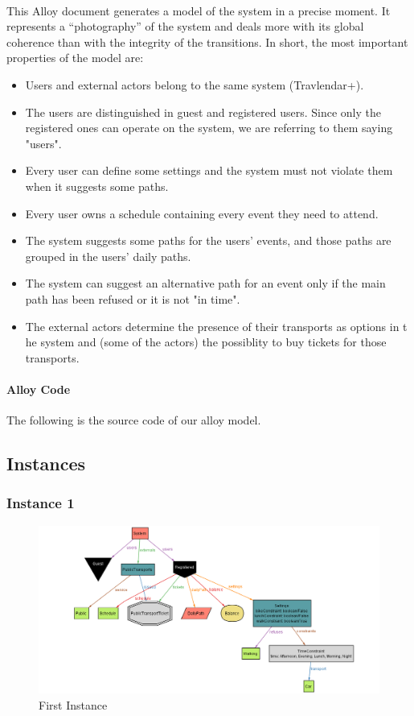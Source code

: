\documentclass{article}
\begin{document}
\paragraph{}
This Alloy document generates a model of the system in a precise moment. It represents a “photography” of the system and deals more with its global coherence than with the integrity of the transitions. In short, the most important properties of the model are:
\begin{itemize}
\item{} Users and external actors belong to the same system (Travlendar+).
\item{} The users are distinguished in guest and registered users. Since only the registered ones can operate on the system, we are referring to them saying "users".
\item{} Every user can define some settings and the system must not violate them when it suggests some paths.
\item{} Every user owns a schedule containing every event they need to attend.
\item{} The system suggests some paths for the users' events, and those paths are grouped in the users' daily paths.
\item{} The system can suggest an alternative path for an event only if the main path has been refused or it is not "in time".
\item{} The external actors determine the presence of their transports as options in t he system and (some of the actors) the possiblity to buy tickets for those transports.
\end{itemize}
\paragraph{Alloy Code\\} The following is the source code of our alloy model.

\subsection{Instances}
\subsubsection{Instance 1}
\begin{figure}[H]
\includegraphics[width=\linewidth]{Instance_1.png}
\caption{First Instance}
\label{fig:ALLOY1}
\end{figure}
\end{document}
